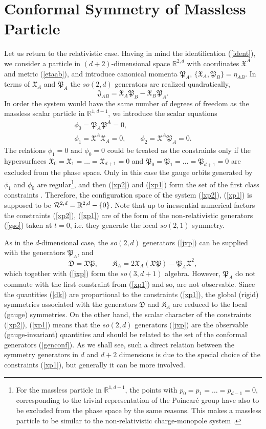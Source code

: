 \documentclass[a4paper,12pt]{article}
\def\R{\mathbb R}
\def\X{\mathfrak X}
\def\P{\mathfrak P}
\def\K{\mathfrak K}
\def\J{\mathfrak J}
\def\D{\mathfrak D}
\begin{document}
\section{Conformal Symmetry of Massless Particle}
Let us return to the relativistic case.
Having in mind  the identification (\ref{ident}),
we consider a particle
in $(d+2)$-dimensional space
$\R^{2,d}$
with  coordinates
$\X^A$ and metric (\ref{etaab}),
and introduce
canonical momenta
$\P_A$,
$\{\X_A,\P_B\}=\eta_{AB}$.
In terms of $\X_A$ and $\P_A$
the $so(2,d)$ generators
are realized
quadratically,
\begin{equation}
\J_{AB}=\X_A \P_B - \X_B \P_A.
\label{jxp}
\end{equation}
In order the system
would have the same number of degrees
of freedom as the massless scalar
particle in $\R^{1,d-1}$,
we introduce the scalar equations
\begin{eqnarray}
&\phi_0= \P_A\P^A=0,&
\label{xp2}\\
&\phi_1=\X^A\X_A=0,\qquad
\phi_2=\X^A\P_A=0.&\label{xp1}
\end{eqnarray}
The relations $\phi_1=0$
and $\phi_0=0$
could be treated
as the constraints only if
the hypersurfaces
$\X_0=\X_1=\ldots=\X_{d+1}=0$
and $\P_0=\P_1=\ldots=\P_{d+1}=0$
are
excluded from the phase space.
Only in this case the gauge orbits
generated by $\phi_1$ and $\phi_0$
are regular\footnote{
For the massless particle
in $\R^{1,d-1}$,
the points with $p_0=p_1=\ldots=p_{d-1}=0$,
corresponding to the trivial representation
of the Poincar\'e group  have also to be excluded
from the phase space by the
same reasons. This makes a massless particle
to be similar to the non-relativistic
charge-monopole system \cite{mp}.},
and then (\ref{xp2}) and  (\ref{xp1})
form the set of the first class constraints \cite{HT,PR}.
Therefore, the configuration space
of the system (\ref{xp2}), (\ref{xp1})
is supposed to be
 ${\cal R}^{2,d}=\R^{2,d}-\{0\}$.
Note that up to inessential numerical factors
the constraints (\ref{xp2}), (\ref{xp1})
are of the form of the
non-relativistic generators (\ref{gso}) taken
at $t=0$, i.e. they
generate the local $so(2,1)$ symmetry.

As in the $d$-dimensional case,
the $so(2,d)$ generators (\ref{jxp})
can be supplied with
the generators $\P_A$, and
\begin{equation}
\D=\X\P,\qquad
\K_A=2\X_A(\X\P)-\P_A\X^2,
\label{dk}
\end{equation}
which together with
(\ref{jxp}) form the
$so(3,d+1)$ algebra. However,
$\P_A$ do not commute with the
first constraint from (\ref{xp1})
and so,  are not observable.
Since the quantities (\ref{dk})
are proportional to the
constraints (\ref{xp1}),
the global (rigid) symmetries associated
with the generators $\D$ and $\K_A$
are reduced to the local (gauge) symmetries.
On the other hand,
the scalar character of
the constraints (\ref{xp2}),
(\ref{xp1})
means  that the $so(2,d)$
generators (\ref{jxp})
are the observable (gauge-invariant)
quantities and should be related to the
set of the conformal generators (\ref{genconf}).
As we shall see,
such a direct
relation between the symmetry generators
in $d$ and $d+2$ dimensions
is due to the special choice of the constraints (\ref{xp1}),
but generally it can be more involved.
\end{document}
